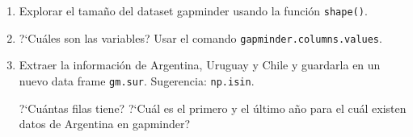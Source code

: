 \documentclass[a4paper,11pt]{article}
\theoremstyle{definition}
\begin{document}
\begin{enumerate}
\item Explorar el tama\~no del dataset gapminder usando la función \lstinline{shape()}.

\item ?`Cu\'ales son las variables? Usar el comando \lstinline{gapminder.columns.values}.

\item Extraer la informaci\'on de Argentina, Uruguay y Chile y guardarla en un nuevo data frame \lstinline{gm.sur}. Sugerencia: \lstinline{np.isin}.

?`Cu\'antas filas tiene? ?`Cu\'al es el primero y el \'ultimo a\~no para el cu\'al existen datos de Argentina en gapminder?


\end{enumerate}
\end{document}
